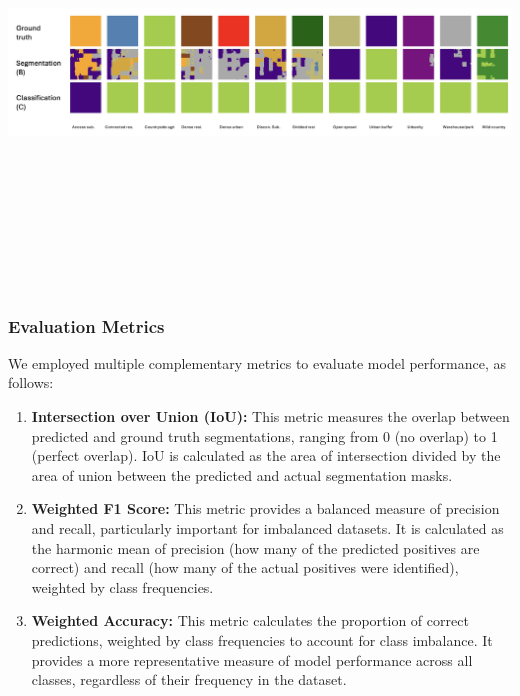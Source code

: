 \documentclass[
  letterpaper,
  DIV=11,
  numbers=noendperiod]{scrartcl}
\begin{document}
\begin{center}
\includegraphics[width=\textwidth,height=4.47917in]{../figures/algo_design/comparison_B_C.png}
\end{center}

\subsubsection{Evaluation Metrics}\label{evaluation-metrics}

We employed multiple complementary metrics to evaluate model
performance, as follows:

\begin{enumerate}
\def\labelenumi{\arabic{enumi}.}
\item
  \textbf{Intersection over Union (IoU):} This metric measures the
  overlap between predicted and ground truth segmentations, ranging from
  0 (no overlap) to 1 (perfect overlap). IoU is calculated as the area
  of intersection divided by the area of union between the predicted and
  actual segmentation masks.
\item
  \textbf{Weighted F1 Score:} This metric provides a balanced measure of
  precision and recall, particularly important for imbalanced datasets.
  It is calculated as the harmonic mean of precision (how many of the
  predicted positives are correct) and recall (how many of the actual
  positives were identified), weighted by class frequencies.
\item
  \textbf{Weighted Accuracy:} This metric calculates the proportion of
  correct predictions, weighted by class frequencies to account for
  class imbalance. It provides a more representative measure of model
  performance across all classes, regardless of their frequency in the
  dataset.
\end{enumerate}
\end{document}
